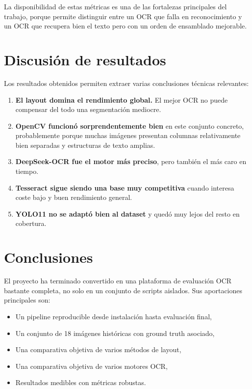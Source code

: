 \documentclass[11pt, a4paper]{article}
\begin{document}
La disponibilidad de estas m\'etricas es una de las fortalezas principales del trabajo, porque
permite distinguir entre un OCR que falla en reconocimiento y un OCR que recupera bien el texto
pero con un orden de ensamblado mejorable.

\section{Discusi\'on de resultados}

Los resultados obtenidos permiten extraer varias conclusiones t\'ecnicas relevantes:

\begin{enumerate}
    \item \textbf{El layout domina el rendimiento global.} El mejor OCR no puede compensar del todo
    una segmentaci\'on mediocre.
    \item \textbf{OpenCV funcion\'o sorprendentemente bien} en este conjunto concreto, probablemente
    porque muchas im\'agenes presentan columnas relativamente bien separadas y estructuras de texto
    amplias.
    \item \textbf{DeepSeek-OCR fue el motor m\'as preciso}, pero tambi\'en el m\'as caro en tiempo.
    \item \textbf{Tesseract sigue siendo una base muy competitiva} cuando interesa coste bajo y
    buen rendimiento general.
    \item \textbf{YOLO11 no se adapt\'o bien al dataset} y qued\'o muy lejos del resto en cobertura.
\end{enumerate}

\section{Conclusiones}

El proyecto ha terminado convertido en una plataforma de evaluaci\'on OCR bastante completa,
no solo en un conjunto de scripts aislados. Sus aportaciones principales son:

\begin{itemize}
    \item Un pipeline reproducible desde instalaci\'on hasta evaluaci\'on final,
    \item Un conjunto de 18 im\'agenes hist\'oricas con ground truth asociado,
    \item Una comparativa objetiva de varios m\'etodos de layout,
    \item Una comparativa objetiva de varios motores OCR,
    \item Resultados medibles con m\'etricas robustas.
\end{itemize}
\end{document}
